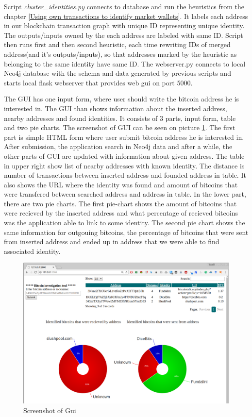 \documentclass[
  digital, %
  table,   %
  lof,     %
  lot,     %
  oneside
]{fithesis3}
\begin{document}
Script \emph{cluster\_identities.py} connects to database and run the heuristics from the chapter
\ref{Using own transactions to identify market wallets}.
It labels each address in our blockchain transaction graph
with unique ID representing unique identity. The outputs/inputs owned by the each address are labeled
with same ID. Script then runs first and then second heuristic,
each time rewriting IDs of merged address(and it's outputs/inputs), so that 
addresses marked by the heuristic as belonging to the same identity have same ID.
The webserver.py connects to local Neo4j database with the schema and data generated by previous
scripts and starts local flask webserver that provides web gui on port 5000.

The GUI has one input form, where user should write the bitcoin address he is interested in.
The GUI than shows information about the inserted address, nearby addresses and found identities.
It consists of 3 parts, input form, table and two pie charts. The screenshot of GUI can be seen on picture \ref{guiscreen}.
The first part is simple HTML form where user submit bitcoin address he is interested in.
After submission, the application search in Neo4j data and after a while,
the other parts of GUI are updated with information about given address.
The table in upper right show list of nearby addresses with known identity. The distance is number of transactions
between inserted address and founded address in table. It also shows the URL where the identity was found
and amount of bitcoins that were transfered between searched address and address in table.
In the lower part, there are two pie charts. The first pie-chart shows the amount of bitcoins that were recieved by the inserted address
and what percentage of recieved bitcoins was the application able to link to some identity.
The second pie chart shows the same information for outgouing bitcoins, the percentage of bitcoins that were sent from inserted address
and ended up in address that we were able to find associated identity.

\begin{figure}[!htb]
\hspace*{-1cm}
    \centering
    \includegraphics[width=1\textwidth]{shot}
    \caption{Screenshot of Gui}
    \label{guiscreen}
\end{figure}
\end{document}
